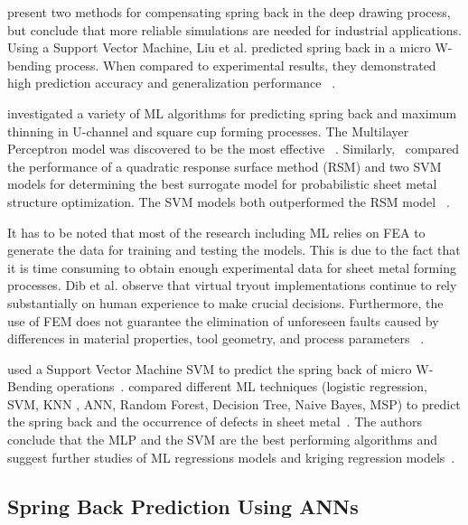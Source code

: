 \cite{lingbeek2005development} present two methods for compensating spring back in the deep
drawing process, but conclude that more reliable simulations are needed for industrial applications.
Using a Support Vector Machine, Liu et al. predicted spring back in a micro W-bending process.
When compared to experimental results, they demonstrated high prediction accuracy and generalization performance
~\cite[p. 1]{liu2019springback}.

\cite{dib2020single} investigated a variety of \ac{ML} algorithms for predicting spring back and
maximum thinning in
U-channel and square cup forming processes.
The Multilayer Perceptron model was discovered to be the most effective
~\cite[]{dib2020single}.
Similarly,~\cite{abdessalem2015probabilistic} compared the performance of a quadratic response surface method (RSM)
and two \ac{SVM} models for determining the best surrogate model for probabilistic sheet metal structure optimization.
The \ac{SVM} models both outperformed the RSM model
~\cite[]{abdessalem2015probabilistic}.

It has to be noted that most of the research including \ac{ML} relies on FEA to generate the data for training and
testing the models.
This is due to the fact that it is time consuming to obtain enough experimental data for
sheet metal forming processes.
Dib et al. observe that virtual tryout implementations continue to rely substantially on human experience to make
crucial decisions.
Furthermore, the use of FEM does not guarantee the elimination of unforeseen faults caused by differences in material
properties, tool geometry, and process parameters
~\cite[p. 2]{dib2020single}.

\cite{liu2019springback} used a Support Vector Machine \ac{SVM} to predict the spring back of
micro W-Bending operations~\cite[]{liu2019springback}.
\cite{dib2020single} compared different \ac{ML} techniques (logistic regression, SVM, KNN
, ANN, Random Forest, Decision Tree, Naive Bayes, MSP) to predict the spring back and the occurrence of
defects in sheet metal~\cite[p. 1]{dib2020single}.
The authors conclude that the MLP and the SVM are the best performing algorithms and
suggest further studies of ML regressions models and kriging regression
models~\cite[p. 13]{dib2020single}.

\subsection*{Spring Back Prediction Using ANNs}

